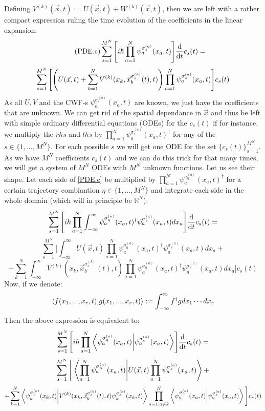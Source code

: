 \documentclass[11pt, a4paper]{article} %
\newcommand{\R}{\mathbb{R}} %
\begin{document}
Defining $V^{(k)}(\vec{x},t):=U(\vec{x},t)+W^{(k)}(\vec{x},t)$, then we are left with a rather compact expression ruling the time evolution of the coefficients in the linear expansion:
\begin{equation}\label{PDE.c}\tag{PDE.c}
\sum_{s=1}^{M^N} \qty[i\hbar \prod_{a=1}^N  \psi_a^{\sigma_s^{(a)}}(x_a,t)] \dv{}{t}c_s(t) = 
\end{equation}
$$
\sum_{s=1}^{M^N} \qty[\qty( U(\vec{x},t)+\sum_{k=1}^N V^{(k)}(x_k, \vec{x}^{\sigma_s^{(k)}}_b(t),t))\prod_{a=1}^N \psi_a^{\sigma_s^{(a)}}(x_a,t)]c_s(t)
$$
As all $U, V$ and the CWF-s $\psi_a^{\sigma_s^{(a)}}(x_a,t)$ are known, we just have the coefficients that are unknown. We can get rid of the spatial dependance in $\vec{x}$ and thus be left with simple ordinary differential equations (ODEs) for the $c_s(t)$ if for instance, we multiply the $rhs$ and $lhs$ by $\prod_{a=1}^N \psi_a^{\sigma_s^{(a)}}(x_a,t)^\dagger$ for any of the $s\in \{1,...,M^N\}$. For each possible $s$ we will get one ODE for the set $\{c_s(t)\}_{s=1}^{M^N}$. As we have $M^N$ coefficients $c_s(t)$ and we can do this trick for that many times, we will get a system of $M^N$ ODEs with $M^N$ unknown functions. Let us see their shape. Let each side of \ref{PDE.c} be multiplied by $\prod_{a=1}^N \psi_a^{\sigma_\eta^{(a)}}(x_a,t)^\dagger$ for a certain trajectory combiantion $\eta\in\{1,...,M^N \}$ and integrate each side in the whole domain (which will in principle be $\R^N$):
$$
\sum_{s=1}^{M^N} \qty[i\hbar \prod_{a=1}^N  \int_{-\infty}^\infty \psi_a^{\sigma_\eta^{(a)}}(x_a,t)^\dagger \psi_a^{\sigma_s^{(a)}}(x_a,t)dx_a] \dv{}{t}c_s(t) = 
$$
$$
\sum_{s=1}^{M^N} \Bigg[ \int_{-\infty}^\infty U(\vec{x},t) \prod_{a=1}^N \psi_a^{\sigma_\eta^{(a)}}(x_a,t)^\dagger \psi_a^{\sigma_s^{(a)}}(x_a,t)dx_a+
$$
$$
+\sum_{k=1}^N \int_{-\infty}^\infty V^{(k)}(x_k, \vec{x}^{\sigma_s^{(k)}}_b(t),t) \prod_{a=1}^N \psi_a^{\sigma_\eta^{(a)}}(x_a,t)^\dagger \psi_a^{\sigma_s^{(a)}}(x_a,t)dx_a\Bigg]c_s(t)
$$
Now, if we denote:
$$
\bra{f(x_1,...,x_r,t)}\ket{g(x_1,...,x_r,t)}:=\int_{-\infty}^\infty f^\dagger g dx_1\cdots dx_r
$$
Then the above expression is equivalent to:
$$
\sum_{s=1}^{M^N} \qty[i\hbar \prod_{a=1}^N  \bra{\psi_a^{\sigma_\eta^{(a)}}(x_a,t)}\ket{\psi_a^{\sigma_s^{(a)}}(x_a,t)}] \dv{}{t}c_s(t) = 
$$
$$
\sum_{s=1}^{M^N} \Bigg[\bra{\prod_{a=1}^N  \psi_a^{\sigma_\eta^{(a)}}(x_a,t)}\ket{U(\vec{x},t)  \prod_{a=1}^N \psi_a^{\sigma_s^{(a)}}(x_a,t)}+
$$
$$
+\sum_{k=1}^N\bra{\psi_k^{\sigma_\eta^{(k)}}(x_k,t)}\ket{V^{(k)}(x_k,\vec{x}_b^{\sigma_s^{(k)}}(t),t) \psi_k^{\sigma_s^{(k)}}(x_k,t)} \prod_{a=1;a\neq k}^N  \bra{\psi_a^{\sigma_\eta^{(a)}}(x_a,t)}\ket{\psi_a^{\sigma_s^{(a)}}(x_a,t)}  \Bigg]c_s(t)
$$
\end{document}
